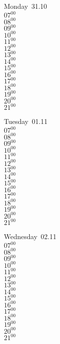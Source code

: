 \documentclass[11pt,a4paper]{book}\usepackage[]{graphicx}\usepackage[]{color}
\begin{document}
\begin{headerbox}
\end{headerbox}
\begin{weekdaybox}
  Monday~31.10\\
  { 
  \vfill
  $07^{00}$\\
$08^{00}$\\
$09^{00}$\\
$10^{00}$\\
$11^{00}$\\
$12^{00}$\\
$13^{00}$\\
$14^{00}$\\
$15^{00}$\\
$16^{00}$\\
$17^{00}$\\
$18^{00}$\\
$19^{00}$\\
$20^{00}$\\
$21^{00}$\\
  }
\end{weekdaybox}
\begin{weekdaybox}
  Tuesday~01.11\\
  { 
  \vfill
  $07^{00}$\\
$08^{00}$\\
$09^{00}$\\
$10^{00}$\\
$11^{00}$\\
$12^{00}$\\
$13^{00}$\\
$14^{00}$\\
$15^{00}$\\
$16^{00}$\\
$17^{00}$\\
$18^{00}$\\
$19^{00}$\\
$20^{00}$\\
$21^{00}$\\
  }
\end{weekdaybox}
\begin{weekdaybox}
  Wednesday~02.11\\
  { 
  \vfill
  $07^{00}$\\
$08^{00}$\\
$09^{00}$\\
$10^{00}$\\
$11^{00}$\\
$12^{00}$\\
$13^{00}$\\
$14^{00}$\\
$15^{00}$\\
$16^{00}$\\
$17^{00}$\\
$18^{00}$\\
$19^{00}$\\
$20^{00}$\\
$21^{00}$\\
  }
\end{weekdaybox}
\end{document}
